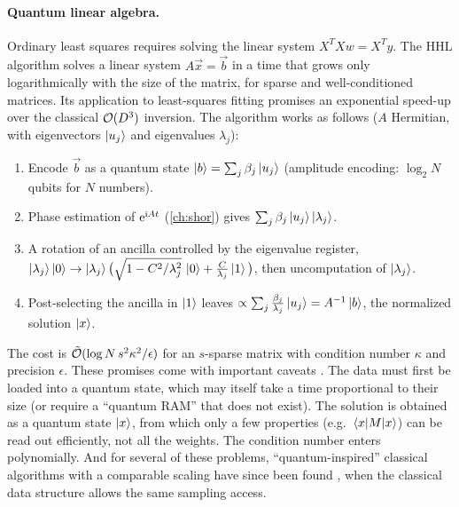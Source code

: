 \paragraph{Quantum linear algebra.} Ordinary least squares requires solving the linear system $X^TXw=X^Ty$. The HHL algorithm \cite{HHL2009} solves a linear system $A\vec x=\vec b$ in a time that grows only logarithmically with the
size of the matrix, for sparse and well-conditioned matrices. Its application to least-squares fitting \cite{Wiebe2012} promises an exponential speed-up over the classical $\mathcal O(D^3)$ inversion. The algorithm works as follows
($A$ Hermitian, with eigenvectors $\left|u_j\right\rangle$ and eigenvalues $\lambda_j$):
\begin{enumerate}
  \item Encode $\vec b$ as a quantum state $\left|b\right\rangle=\sum_j\beta_j\left|u_j\right\rangle$ (amplitude encoding: $\log_2N$ qubits for $N$ numbers).
  \item Phase estimation of $\mathrm e^{\mathrm i At}$ (\cref{ch:shor}) gives $\sum_j\beta_j\left|u_j\right\rangle\left|\lambda_j\right\rangle$.
  \item A rotation of an ancilla controlled by the eigenvalue register,
  $\left|\lambda_j\right\rangle\left|0\right\rangle\to\left|\lambda_j\right\rangle\big(\sqrt{1-C^2/\lambda_j^2}\,\left|0\right\rangle+\frac C{\lambda_j}\left|1\right\rangle\big)$,
  then uncomputation of $\left|\lambda_j\right\rangle$.
  \item Post-selecting the ancilla in $\left|1\right\rangle$ leaves $\propto\sum_j\frac{\beta_j}{\lambda_j}\left|u_j\right\rangle=A^{-1}\left|b\right\rangle$, the normalized solution $\left|x\right\rangle$.
\end{enumerate}
The cost is $\tilde{\mathcal O}(\log N\,s^2\kappa^2/\epsilon)$ for an $s$-sparse matrix with condition number $\kappa$ and precision $\epsilon$. These promises come with important caveats \cite{Aaronson2015}. The data must first be loaded into a quantum
state, which may itself take a time proportional to their size (or require a ``quantum RAM'' that does not exist). The solution is obtained as a quantum state $\left|x\right\rangle$, from which only a few properties (e.g.\ $\left\langle x\middle|M\middle|x\right\rangle$) can be read out
efficiently, not all the weights. The condition number enters polynomially. And for several of these problems, ``quantum-inspired'' classical algorithms with a comparable scaling have since been found \cite{Tang2019}, when the classical
data structure allows the same sampling access.

